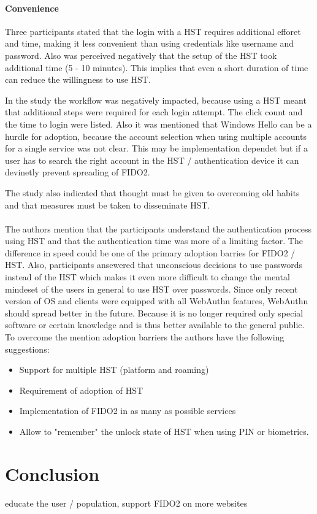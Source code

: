 \documentclass[runningheads]{llncs}
\begin{document}
\paragraph{Convenience}
Three participants stated that the login with a HST requires additional efforet and time, making it less convenient than using credentials like username and password. Also was perceived negatively that the setup of the HST took additional time (5 - 10 minutes). This implies that even a short duration of time can reduce the willingness to use HST.

In the study the workflow was negatively impacted, because using a HST meant that additional steps were required for each login attempt. The click count and the time to login were listed. Also it was mentioned that Windows Hello can be a hurdle for adoption, because the account selection when using multiple accounts for a single service was not clear. This may be implementation dependet but if a user has to search the right account in the HST / authentication device it can devinetly prevent spreading of FIDO2. 

The study also indicated that thought must be given to overcoming old habits and that measures must be taken to disseminate HST.

\paragraph{}
The authors mention that the participants understand the authentication process using HST and that the authentication time was more of a limiting factor. The difference in speed could be one of the primary adoption barries for FIDO2 / HST. Also, participants ansewered that unconscious decisions to use passwords instead of the HST which makes it even more difficult to change the mental mindeset of the users in general to use HST over passwords. Since only recent version of OS and clients were equipped with all WebAuthn features, WebAuthn should spread better in the future. Because it is no longer required only special software or certain knowledge and is thus better available to the general public. To overcome the mention adoption barriers the authors have the following suggestions:
\begin{itemize}
  \item Support for multiple HST (platform and roaming)
  \item Requirement of adoption of HST
  \item Implementation of FIDO2 in as many as possible services
  \item Allow to "remember" the unlock state of HST when using PIN or biometrics.
\end{itemize}
\cite{255646}
\section{Conclusion}
educate the user / population, support FIDO2 on more websites


\end{document}
